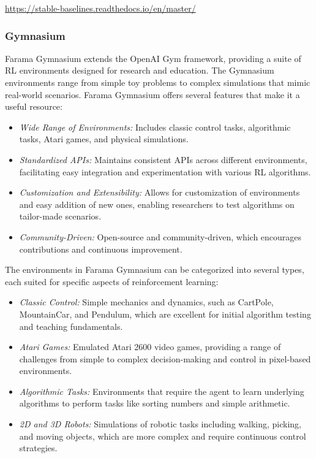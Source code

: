 \begin{resourcebox}
\vspace{\baselineskip}

\small
\url{https://stable-baselines.readthedocs.io/en/master/}
\normalsize

\vspace{\baselineskip}
\end{resourcebox}

\subsubsection*{Gymnasium}

Farama Gymnasium extends the OpenAI Gym framework, providing a suite of RL environments designed for research and education. The Gymnasium environments range from simple toy problems to complex simulations that mimic real-world scenarios. Farama Gymnasium offers several features that make it a useful resource:

\begin{itemize}
\item \emph{Wide Range of Environments:} Includes classic control tasks, algorithmic tasks, Atari games, and physical simulations.
\item \emph{Standardized APIs:} Maintains consistent APIs across different environments, facilitating easy integration and experimentation with various RL algorithms.
\item \emph{Customization and Extensibility:} Allows for customization of environments and easy addition of new ones, enabling researchers to test algorithms on tailor-made scenarios.
\item \emph{Community-Driven:} Open-source and community-driven, which encourages contributions and continuous improvement.
\end{itemize}

The environments in Farama Gymnasium can be categorized into several types, each suited for specific aspects of reinforcement learning:

\begin{itemize}
\item \emph{Classic Control:} Simple mechanics and dynamics, such as CartPole, MountainCar, and Pendulum, which are excellent for initial algorithm testing and teaching fundamentals.
\item \emph{Atari Games:} Emulated Atari 2600 video games, providing a range of challenges from simple to complex decision-making and control in pixel-based environments.
\item \emph{Algorithmic Tasks:} Environments that require the agent to learn underlying algorithms to perform tasks like sorting numbers and simple arithmetic.
\item \emph{2D and 3D Robots:} Simulations of robotic tasks including walking, picking, and moving objects, which are more complex and require continuous control strategies.
\end{itemize}

